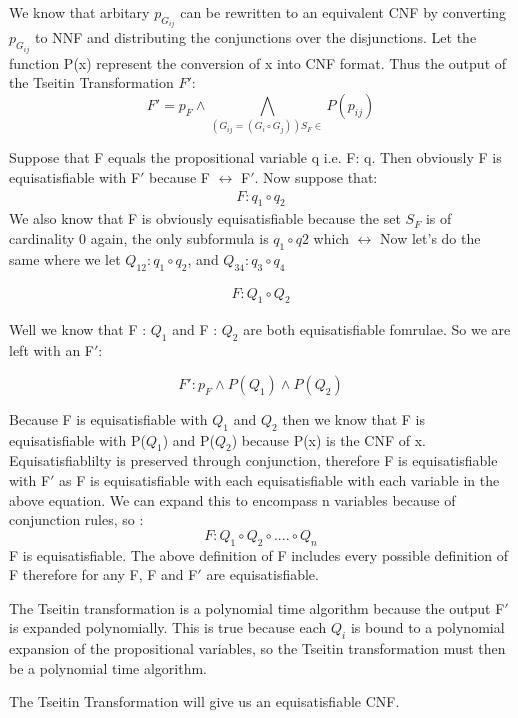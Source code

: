 \documentclass[11pt]{article}
\begin{document}
\begin{enumerate}
We know that arbitary $p_{G_{ij}}$ can be rewritten to an equivalent CNF by converting $p_{G_{ij}}$  to NNF and distributing the conjunctions over the disjunctions. Let the function P(x) represent the conversion of x into CNF format. Thus the output of the Tseitin Transformation $F'$: 
\begin{equation}
F' = p_F \land \bigwedge\limits_{(G_{ij}= (G_i \circ G_j)) S_F \in} P(p_{ij})
\end{equation}

Suppose that F equals the propositional variable q i.e. F: q. Then obviously F is equisatisfiable with F$'$ because F $\leftrightarrow$ F$'$. 
\newline
\newline
Now suppose that:
\begin{gather}
    F: q_1 \circ q_2
\end{gather}
We also know that F is obviously equisatisfiable because the set $S_F$ is of cardinality 0 again, the only subformula is $q_1 \circ q2$ which $\leftrightarrow$
\newline 
Now let's do the same where we let $Q_{12} : q_1 \circ q_2$, and $Q_{34} : q_3 \circ q_4$


\begin{gather}
    F: Q_1 \circ Q_2
\end{gather}

Well we know that F : $Q_1$ and F : $Q_2$ are both equisatisfiable fomrulae. So we are left with an F$'$:

\begin{equation}
    F': p_F \land P(Q_1) \land P(Q_2)
\end{equation}

Because F is equisatisfiable with $Q_1$ and $Q_2$ then we know that F is equisatisfiable with P($Q_1$) and P($Q_2$) because P(x) is the CNF of x. Equisatisfiablilty is preserved through conjunction, therefore F is equisatisfiable with F$'$ as F is equisatisfiable with each equisatisfiable with each variable in the above equation. 
\newline 
We can expand this to encompass n variables because of conjunction rules, so :
\begin{equation}
    F: Q_1 \circ Q_2 \circ  .... \circ Q_n  
\end{equation}
F is equisatisfiable. The above definition of F includes every possible definition of F therefore for any F, F and F$'$ are equisatisfiable.

\newline 
\newline 
The Tseitin transformation is a polynomial time algorithm because the output F$'$ is expanded polynomially. This is true because each $Q_i$ is bound to a polynomial expansion of the propositional variables, so the Tseitin transformation must then be a polynomial time algorithm.



The Tseitin Transformation will give us an equisatisfiable CNF.


\end{enumerate}
\end{document}
